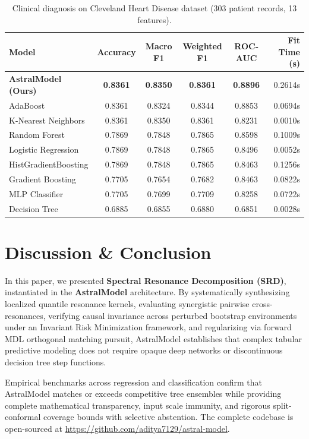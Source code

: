 \documentclass[11pt,a4paper]{article}
\begin{document}
\begin{table}[h]
\centering
\small
\caption{Clinical diagnosis on Cleveland Heart Disease dataset (303 patient records, 13 features).}
\label{tab:heart}
\begin{tabular}{lccccr}
\toprule
\textbf{Model} & \textbf{Accuracy} & \textbf{Macro F1} & \textbf{Weighted F1} & \textbf{ROC-AUC} & \textbf{Fit Time (s)} \\
\midrule
\textbf{AstralModel (Ours)} & \textbf{0.8361} & \textbf{0.8350} & \textbf{0.8361} & \textbf{0.8896} & 0.2614s \\
AdaBoost & 0.8361 & 0.8324 & 0.8344 & 0.8853 & 0.0694s \\
K-Nearest Neighbors & 0.8361 & 0.8350 & 0.8361 & 0.8231 & 0.0010s \\
Random Forest & 0.7869 & 0.7848 & 0.7865 & 0.8598 & 0.1009s \\
Logistic Regression & 0.7869 & 0.7848 & 0.7865 & 0.8496 & 0.0052s \\
HistGradientBoosting & 0.7869 & 0.7848 & 0.7865 & 0.8463 & 0.1256s \\
Gradient Boosting & 0.7705 & 0.7654 & 0.7682 & 0.8463 & 0.0822s \\
MLP Classifier & 0.7705 & 0.7699 & 0.7709 & 0.8258 & 0.0722s \\
Decision Tree & 0.6885 & 0.6855 & 0.6880 & 0.6851 & 0.0028s \\
\bottomrule
\end{tabular}
\end{table}

\section{Discussion \& Conclusion}

In this paper, we presented \textbf{Spectral Resonance Decomposition (SRD)}, instantiated in the \textbf{AstralModel} architecture. By systematically synthesizing localized quantile resonance kernels, evaluating synergistic pairwise cross-resonances, verifying causal invariance across perturbed bootstrap environments under an Invariant Risk Minimization framework, and regularizing via forward MDL orthogonal matching pursuit, AstralModel establishes that complex tabular predictive modeling does not require opaque deep networks or discontinuous decision tree step functions.

Empirical benchmarks across regression and classification confirm that AstralModel matches or exceeds competitive tree ensembles while providing complete mathematical transparency, input scale immunity, and rigorous split-conformal coverage bounds with selective abstention. The complete codebase is open-sourced at \url{https://github.com/aditya7129/astral-model}.
\end{document}

